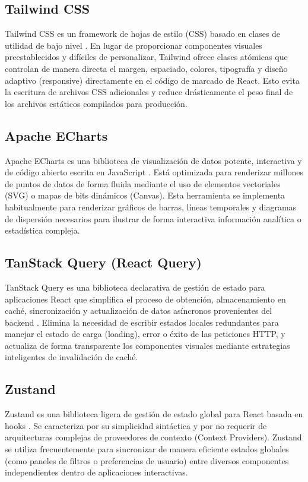 \subsection{Tailwind CSS}
Tailwind CSS es un framework de hojas de estilo (CSS) basado en clases de utilidad de bajo nivel \cite{wathan2024}. En lugar de proporcionar componentes visuales preestablecidos y difíciles de personalizar, Tailwind ofrece clases atómicas que controlan de manera directa el margen, espaciado, colores, tipografía y diseño adaptivo (responsive) directamente en el código de marcado de React. Esto evita la escritura de archivos CSS adicionales y reduce drásticamente el peso final de los archivos estáticos compilados para producción.

\subsection{Apache ECharts}
Apache ECharts es una biblioteca de visualización de datos potente, interactiva y de código abierto escrita en JavaScript \cite{echarts2018}. Está optimizada para renderizar millones de puntos de datos de forma fluida mediante el uso de elementos vectoriales (SVG) o mapas de bits dinámicos (Canvas). Esta herramienta se implementa habitualmente para renderizar gráficos de barras, líneas temporales y diagramas de dispersión necesarios para ilustrar de forma interactiva información analítica o estadística compleja.

\subsection{TanStack Query (React Query)}
TanStack Query es una biblioteca declarativa de gestión de estado para aplicaciones React que simplifica el proceso de obtención, almacenamiento en caché, sincronización y actualización de datos asíncronos provenientes del backend \cite{linsley2024}. Elimina la necesidad de escribir estados locales redundantes para manejar el estado de carga (loading), error o éxito de las peticiones HTTP, y actualiza de forma transparente los componentes visuales mediante estrategias inteligentes de invalidación de caché.

\subsection{Zustand}
Zustand es una biblioteca ligera de gestión de estado global para React basada en hooks \cite{kato2024}. Se caracteriza por su simplicidad sintáctica y por no requerir de arquitecturas complejas de proveedores de contexto (Context Providers). Zustand se utiliza frecuentemente para sincronizar de manera eficiente estados globales (como paneles de filtros o preferencias de usuario) entre diversos componentes independientes dentro de aplicaciones interactivas.



